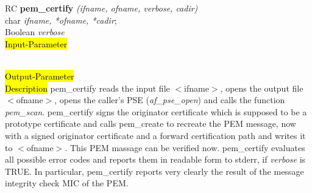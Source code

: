 RC {\bf pem\_certify} {\em (ifname, ofname, verbose, cadir)} \\
char {\em *ifname, *ofname, *cadir}; \\
Boolean {\em verbose} \\
\hl{Input-Parameter}



 \\
\hl{Output-Parameter}
 \\
\hl{Description}
pem\_certify reads the input file $<$ifname$>$,
opens the output file $<$ofname$>$,
opens the caller's PSE ({\em af\_pse\_open})
and calls the function {\em pem\_scan}.
pem\_certify signs the originator certificate which is supposed to be 
a prototype certificate and calls
pem\_create to recreate the PEM message, now with a
signed originator certificate and a forward certification path
and writes it to $<$ofname$>$.
This PEM massage  can be verified now.
pem\_certify evaluates all possible error codes and reports
them in readable form to stderr, if {\em verbose } is TRUE.
In particular, pem\_certify reports very clearly
the result of the message integrity check MIC of the PEM.
